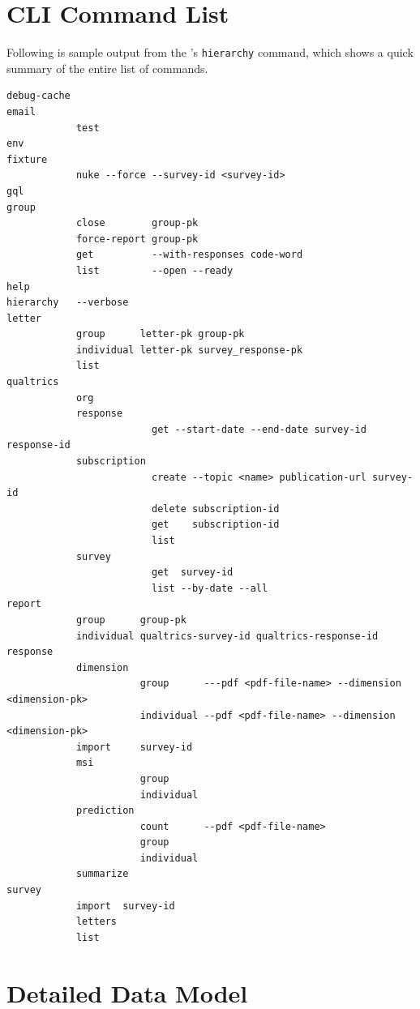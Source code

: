 \documentclass{article}
\begin{document}

\appendix

\section{CLI Command List}
\label{sec:cli-command-list}

Following is sample output from the \cli's \texttt{hierarchy} command,
which shows a quick summary of the entire list of commands.


\begin{verbatim}
debug-cache
email
            test
env
fixture
            nuke --force --survey-id <survey-id>
gql
group
            close        group-pk
            force-report group-pk
            get          --with-responses code-word
            list         --open --ready
help
hierarchy   --verbose
letter
            group      letter-pk group-pk
            individual letter-pk survey_response-pk
            list
qualtrics
            org
            response
                         get --start-date --end-date survey-id response-id
            subscription
                         create --topic <name> publication-url survey-id
                         delete subscription-id
                         get    subscription-id
                         list
            survey
                         get  survey-id
                         list --by-date --all
report
            group      group-pk
            individual qualtrics-survey-id qualtrics-response-id
response
            dimension
                       group      ---pdf <pdf-file-name> --dimension <dimension-pk>
                       individual --pdf <pdf-file-name> --dimension <dimension-pk>
            import     survey-id
            msi
                       group
                       individual
            prediction
                       count      --pdf <pdf-file-name>
                       group
                       individual
            summarize
survey
            import  survey-id
            letters
            list
\end{verbatim}

\section{Detailed Data Model}
\label{sec:detailed-data-model}
\end{document}
